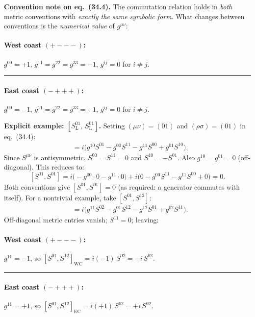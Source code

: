 \documentclass[12pt]{article}
\theoremstyle{remark}
\begin{document}
\noindent\textbf{Convention note on eq.~(34.4).}
The commutation relation holds in \emph{both} metric conventions with
\emph{exactly the same symbolic form}.
What changes between conventions is the \emph{numerical value} of $g^{\mu\nu}$:

\paragraph{West coast $(+{-}{-}{-})$:} $g^{00}=+1$,\; $g^{11}=g^{22}=g^{33}=-1$,\; $g^{ij}=0$ for $i\neq j$.

\medskip\noindent\rule{\linewidth}{0.4pt}\medskip

\paragraph{East coast $(-{+}{+}{+})$:} $g^{00}=-1$,\; $g^{11}=g^{22}=g^{33}=+1$,\; $g^{ij}=0$ for $i\neq j$.

\medskip

\noindent\textbf{Explicit example: $[S^{01}_{\mathrm{L}},\, S^{01}_{\mathrm{L}}]$.}
Setting $(\mu\nu)=(01)$ and $(\rho\sigma)=(01)$ in eq.~(34.4):
\begin{align*}
  [S^{01},S^{01}]
  &= i\bigl(g^{10}S^{01} - g^{00}S^{11} - g^{11}S^{00} + g^{01}S^{10}\bigr).
\end{align*}
Since $S^{\mu\nu}$ is antisymmetric, $S^{00}=S^{11}=0$ and $S^{10}=-S^{01}$.
Also $g^{10}=g^{01}=0$ (off-diagonal). This reduces to:
\[
  [S^{01},S^{01}] = i\bigl(-g^{00}\cdot 0 - g^{11}\cdot 0\bigr)
  + i\bigl(0 - g^{00}S^{11} - g^{11}S^{00} + 0\bigr) = 0.
\]
Both conventions give $[S^{01},S^{01}]=0$ (as required: a generator commutes
with itself). For a nontrivial example, take $[S^{01},S^{12}]$:
\begin{align*}
  [S^{01},S^{12}]
  &= i\bigl(g^{11}S^{02} - g^{01}S^{12} - g^{12}S^{01} + g^{02}S^{11}\bigr).
\end{align*}
Off-diagonal metric entries vanish; $S^{11}=0$; leaving:

\paragraph{West coast $(+{-}{-}{-})$:} $g^{11}=-1$, so
$[S^{01},S^{12}]_{\mathrm{WC}} = i(-1)\,S^{02} = -i\,S^{02}$.

\medskip\noindent\rule{\linewidth}{0.4pt}\medskip

\paragraph{East coast $(-{+}{+}{+})$:} $g^{11}=+1$, so
$[S^{01},S^{12}]_{\mathrm{EC}} = i(+1)\,S^{02} = +i\,S^{02}$.
\end{document}
